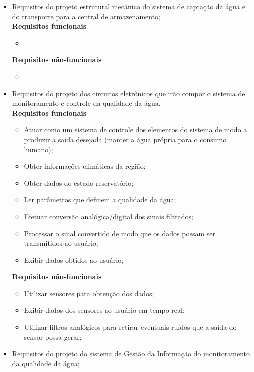     \begin{itemize}
      \item Requisitos do projeto estrutural mecânico do sistema de captação da água e do transporte para a central de armazenamento;\\
	
	\textbf{Requisitos funcionais}
	\begin{itemize}
	  \item 
	\end{itemize}
	
	\textbf{Requisitos não-funcionais}
	\begin{itemize}
	  \item 
	\end{itemize}
	
      \item Requisitos do projeto dos circuitos eletrônicos que irão compor o sistema de monitoramento e controle da qualidade da água.\\
	
	\textbf{Requisitos funcionais}
	\begin{itemize}
	  \item Atuar como um sistema de controle dos elementos do sistema de modo a produzir a saída desejada (manter a água própria para o consumo humano);
	  \item Obter informações climáticas da região;
	  \item Obter dados do estado reservatório;
	  \item Ler parâmetros que definem a qualidade da água;
	  \item Efetuar conversão analógica/digital dos sinais filtrados;
	  \item Processar o sinal convertido de modo que os dados possam ser transmitidos ao usuário;
	  \item Exibir dados obtidos ao usuário;
	\end{itemize}
	
	\textbf{Requisitos não-funcionais}
	\begin{itemize}
	  \item Utilizar sensores para obtenção dos dados;
	  \item Exibir dados dos sensores ao usuário em tempo real;
	  \item Utilizar filtros analógicos para retirar eventuais ruídos que a saída do sensor possa gerar;
	\end{itemize}
	
      \item Requisitos do projeto do sistema de Gestão da Informação do monitoramento da qualidade da água;\\
	 

\end{itemize}
